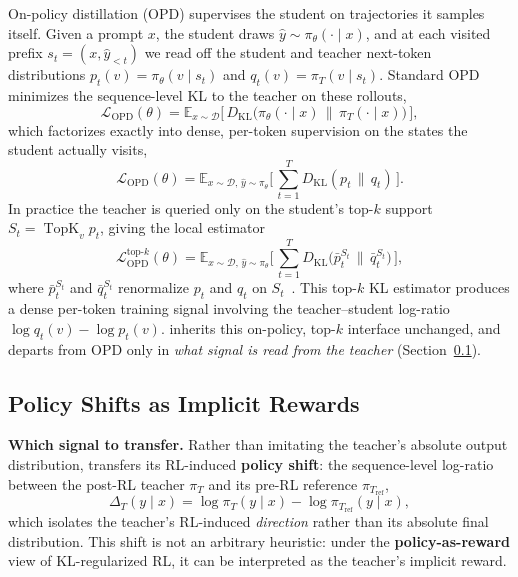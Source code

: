 On-policy distillation (OPD) supervises the student on trajectories it samples
itself. Given a prompt $x$, the student draws $\hat y\sim\pi_\theta(\cdot\mid x)$,
and at each visited prefix $s_t=(x,\hat y_{<t})$ we read off the student and
teacher next-token distributions $p_t(v)=\pi_\theta(v\mid s_t)$ and
$q_t(v)=\pi_T(v\mid s_t)$. Standard OPD minimizes the sequence-level KL to the
teacher on these rollouts,
\begin{equation}
\mathcal{L}_{\mathrm{OPD}}(\theta)
=\mathbb{E}_{x\sim\mathcal{D}}\big[\,
D_{\mathrm{KL}}\big(\pi_\theta(\cdot\mid x)\,\big\|\,\pi_T(\cdot\mid x)\big)\,\big],
\end{equation}
which factorizes exactly into dense, per-token supervision on the states the
student actually visits,
\begin{equation}
\mathcal{L}_{\mathrm{OPD}}(\theta)
=\mathbb{E}_{x\sim\mathcal{D},\,\hat y\sim\pi_\theta}\Big[\,
\textstyle\sum_{t=1}^{T}D_{\mathrm{KL}}(p_t\,\|\,q_t)\,\Big].
\end{equation}
In practice the teacher is queried only on the student's top-$k$ support
$S_t=\operatorname{TopK}_v p_t$, giving the local estimator
\begin{equation}
\mathcal{L}^{\text{top-}k}_{\mathrm{OPD}}(\theta)
=\mathbb{E}_{x\sim\mathcal{D},\,\hat y\sim\pi_\theta}\Big[\,
\textstyle\sum_{t=1}^{T}
D_{\mathrm{KL}}\big(\bar p_t^{S_t}\,\big\|\,\bar q_t^{S_t}\big)\,\Big],
\end{equation}
where $\bar p_t^{S_t}$ and $\bar q_t^{S_t}$ renormalize $p_t$ and $q_t$ on
$S_t$~\citep{li2026rethinkingopd}. This top-$k$ KL estimator produces a dense
per-token training signal involving the teacher--student log-ratio
$\log q_t(v)-\log p_t(v)$. \method{} inherits this on-policy, top-$k$ interface unchanged, and departs from OPD only in \textit{what signal is read from the teacher} 
(Section~\ref{sec:reward}).

\subsection{Policy Shifts as Implicit Rewards}
\label{sec:reward}

\textbf{Which signal to transfer.} Rather than imitating the teacher's absolute output distribution, \method{} transfers its RL-induced \textbf{policy shift}: the sequence-level log-ratio between the post-RL teacher $\pi_T$ and its pre-RL reference $\pi_{T_{\mathrm{ref}}}$,
\begin{equation}
    \Delta_T(y\mid x) = \log \pi_T(y\mid x) - \log \pi_{T_{\mathrm{ref}}}(y\mid x),
    \label{eq:dopd-delta}
\end{equation}
which isolates the teacher's RL-induced \textit{direction} rather than its
absolute final distribution. This shift is not an arbitrary heuristic: under
the \textbf{policy-as-reward} view of KL-regularized RL, it can be interpreted
as the teacher's implicit reward.

